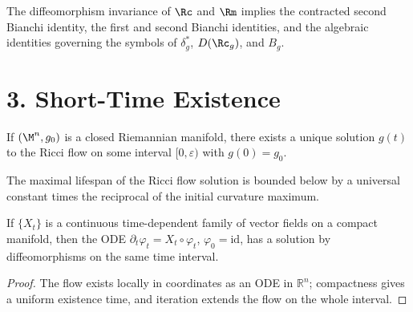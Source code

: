 \begin{remark}
\label{ch03-rem-symbol-of-composition}
The diffeomorphism invariance of \(\Rc\) and \(\Rm\) implies the contracted second Bianchi identity, the first and second Bianchi identities, and the algebraic identities governing the symbols of \(\delta_g^*\), \(D(\Rc_g)\), and \(B_g\).
\end{remark}

\section*{3. Short-Time Existence}

\begin{theorem}
\label{ch03-thm-short-time-existence}
If \((\M^n,g_0)\) is a closed Riemannian manifold, there exists a unique solution \(g(t)\) to the Ricci flow on some interval \([0,\varepsilon)\) with \(g(0)=g_0\).
\end{theorem}

\begin{remark}
\label{ch03-rem-lifetime-lower-bound}
The maximal lifespan of the Ricci flow solution is bounded below by a universal constant times the reciprocal of the initial curvature maximum.
\end{remark}

\begin{lemma}
\label{ch03-lem-deTurck-flow-diffeomorphisms}
If \(\{X_t\}\) is a continuous time-dependent family of vector fields on a compact manifold, then the ODE \(\partial_t\varphi_t=X_t\circ\varphi_t\), \(\varphi_0=\mathrm{id}\), has a solution by diffeomorphisms on the same time interval.
\end{lemma}

\begin{proof}
\sketch The flow exists locally in coordinates as an ODE in \(\mathbb R^n\); compactness gives a uniform existence time, and iteration extends the flow on the whole interval.
\end{proof}

